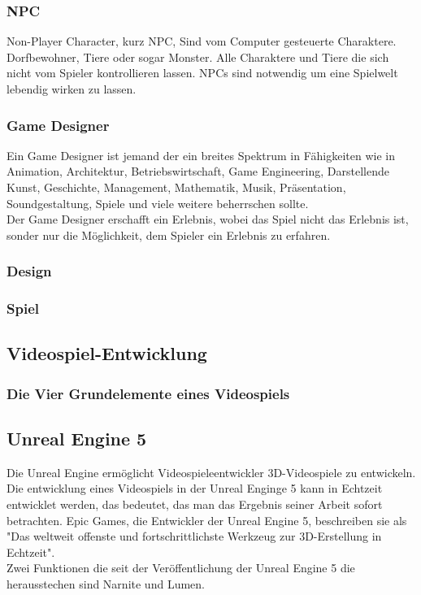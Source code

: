 \documentclass[12pt,a4paper,bibliography=totocnumbered,listof=totocnumbered]{scrartcl}
\begin{document}
\subsubsection{NPC}%
Non-Player Character, kurz NPC, Sind vom Computer gesteuerte Charaktere. Dorfbewohner, Tiere oder sogar Monster. Alle Charaktere und Tiere die sich nicht vom Spieler kontrollieren lassen. NPCs sind notwendig um eine Spielwelt lebendig wirken zu lassen.
\subsubsection{Game Designer} %
Ein Game Designer ist jemand der ein breites Spektrum in Fähigkeiten wie in Animation, Architektur, Betriebswirtschaft, Game Engineering, Darstellende Kunst, Geschichte, Management, Mathematik, Musik, Präsentation, Soundgestaltung, Spiele und viele weitere beherrschen sollte.\\
Der Game Designer erschafft ein Erlebnis, wobei das Spiel nicht das Erlebnis ist, sonder nur die Möglichkeit, dem Spieler ein Erlebnis zu erfahren.
\subsubsection{Design}%
\subsubsection{Spiel}%
\subsection{Videospiel-Entwicklung}
\subsubsection{Die Vier Grundelemente eines Videospiels}%
\subsection{Unreal Engine 5}%
Die Unreal Engine ermöglicht Videospieleentwickler 3D-Videospiele zu entwickeln. Die entwicklung eines Videospiels in der Unreal Enginge 5 kann in Echtzeit entwicklet werden, das bedeutet, das man das Ergebnis seiner Arbeit sofort betrachten. Epic Games, die Entwickler der Unreal Engine 5, beschreiben sie als "Das weltweit offenste und fortschrittlichste Werkzeug zur 3D-Erstellung in Echtzeit".\\
Zwei Funktionen die seit der Veröffentlichung der Unreal Engine 5 die herausstechen sind Narnite und Lumen.
\end{document}
